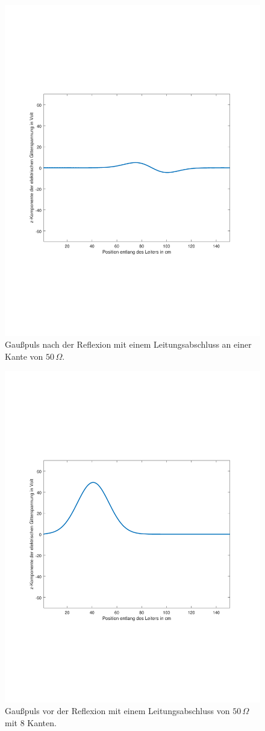\documentclass[Protokollheft.tex]{subfiles}
\begin{document}
\begin{figure}[ht]
	\centering
	\includegraphics[trim = 20mm 65mm 20mm 65mm, clip,width=0.7\linewidth]{untitled4.pdf}
	\caption{Gaußpuls nach der Reflexion mit einem Leitungsabschluss an einer Kante von $50\,\Omega$.}\label{fig:gauss4}
\end{figure}
\begin{figure}[ht]
	\centering
	\includegraphics[trim = 20mm 65mm 20mm 65mm, clip,width=0.7\linewidth]{untitled5.pdf}
	\caption{Gaußpuls vor der Reflexion mit einem Leitungsabschluss von $50\,\Omega$ mit 8 Kanten.}\label{fig:gauss5}
\end{figure}
\end{document}

